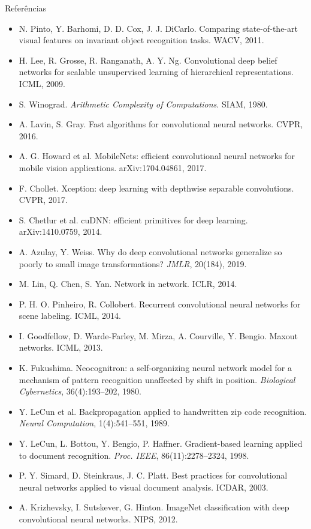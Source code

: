 \documentclass[aspectratio=169,11pt]{beamer}
\begin{document}
\begin{frame}[allowframebreaks]{Referências}
\begin{itemize}
    \item N. Pinto, Y. Barhomi, D. D. Cox, J. J. DiCarlo. Comparing state-of-the-art visual features on invariant object recognition tasks. WACV, 2011.
    \item H. Lee, R. Grosse, R. Ranganath, A. Y. Ng. Convolutional deep belief networks for scalable unsupervised learning of hierarchical representations. ICML, 2009.
    \item S. Winograd. \emph{Arithmetic Complexity of Computations}. SIAM, 1980.
    \item A. Lavin, S. Gray. Fast algorithms for convolutional neural networks. CVPR, 2016.
    \item A. G. Howard et al. MobileNets: efficient convolutional neural networks for mobile vision applications. arXiv:1704.04861, 2017.
    \item F. Chollet. Xception: deep learning with depthwise separable convolutions. CVPR, 2017.
    \item S. Chetlur et al. cuDNN: efficient primitives for deep learning. arXiv:1410.0759, 2014.
    \item A. Azulay, Y. Weiss. Why do deep convolutional networks generalize so poorly to small image transformations? \emph{JMLR}, 20(184), 2019.
    \item M. Lin, Q. Chen, S. Yan. Network in network. ICLR, 2014.
    \item P. H. O. Pinheiro, R. Collobert. Recurrent convolutional neural networks for scene labeling. ICML, 2014.
    \item I. Goodfellow, D. Warde-Farley, M. Mirza, A. Courville, Y. Bengio. Maxout networks. ICML, 2013.
    \item K. Fukushima. Neocognitron: a self-organizing neural network model for a mechanism of pattern recognition unaffected by shift in position. \emph{Biological Cybernetics}, 36(4):193--202, 1980.
    \item Y. LeCun et al. Backpropagation applied to handwritten zip code recognition. \emph{Neural Computation}, 1(4):541--551, 1989.
    \item Y. LeCun, L. Bottou, Y. Bengio, P. Haffner. Gradient-based learning applied to document recognition. \emph{Proc. IEEE}, 86(11):2278--2324, 1998.
    \item P. Y. Simard, D. Steinkraus, J. C. Platt. Best practices for convolutional neural networks applied to visual document analysis. ICDAR, 2003.
    \item A. Krizhevsky, I. Sutskever, G. Hinton. ImageNet classification with deep convolutional neural networks. NIPS, 2012.

\end{itemize}
\end{frame}
\end{document}

